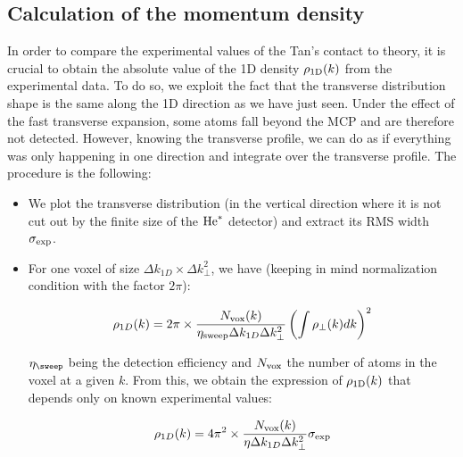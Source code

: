 \subsection{Calculation of the momentum density}


\label{sec:1D_calculation_momentum_density}

In order to compare the experimental values of the Tan's contact to theory, it is crucial to obtain the absolute value of the 1D density $\rho_{\rm{1D}}(k)$ from the experimental data. To do so, we exploit the fact that the transverse distribution shape is the same along the 1D direction as we have just seen. Under the effect of the fast transverse expansion, some atoms fall beyond the MCP and are therefore not detected. However, knowing the transverse profile, we can do as if everything was only happening in one direction and integrate over the transverse profile. The procedure is the following:

\begin{itemize}
    \item We plot the transverse distribution (in the vertical direction where it is not cut out by the finite size of the $\mathrm{He}^*$ detector) and extract its RMS width $\sigma_{\rm{exp}}$.
    \item For one voxel of size $\Delta k_{1D} \times \Delta k_{\perp}^2$, we have (keeping in mind normalization condition with the factor $2\pi$):
    

    \begin{align}
        \rho_{1D}(k) &= 2\pi \times \frac{N_{\rm{vox}}(k)}{\eta_{\rm{sweep}} \Delta k_{1D} \Delta k_{\perp}^2} \left(\int \rho_{\perp}(k) dk \right)^2 \\
    \end{align}
    
    \noindent $\eta_{\rm{\sweep}}$ being the detection efficiency and $N_{\rm{vox}}$ the number of atoms in the voxel at a given $k$. From this, we obtain the expression of $\rho_{\rm{1D}}(k)$ that depends only on known experimental values:
    
    \begin{equation}
        \rho_{1D}(k) = 4\pi^2 \times \frac{N_{\rm{vox}}(k)}{\eta \Delta k_{1D} \Delta k_{\perp}^2} \sigma_{\rm{exp}} 
    \end{equation}

    

\end{itemize}



